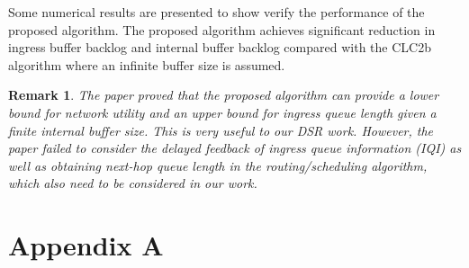 \documentclass[12pt]{article}
\newtheorem*{remark}{Remark}
\begin{document}
Some numerical results are presented to show verify the performance of the proposed algorithm. The proposed algorithm achieves significant reduction in ingress buffer backlog and internal buffer backlog compared with the CLC2b algorithm where an infinite buffer size is assumed. 

\begin{remark}
The paper proved that the proposed algorithm can provide a lower bound for network utility and an upper bound for ingress queue length given a finite internal buffer size. This is very useful to our DSR work. However, the paper failed to consider the delayed feedback of ingress queue information (IQI) as well as obtaining next-hop queue length in the routing/scheduling algorithm, which also need to be considered in our work.
\end{remark}





\section{Appendix A}




\end{document}
